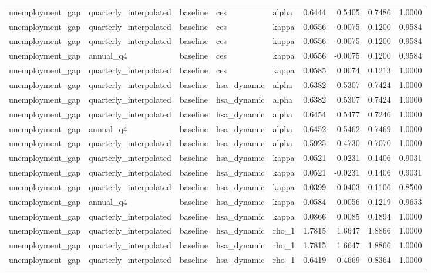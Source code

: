 \begin{tabular}{lllllrrrr}
unemployment\_gap & quarterly\_interpolated & baseline & ces & alpha & 0.6444 & 0.5405 & 0.7486 & 1.0000 \\
unemployment\_gap & quarterly\_interpolated & baseline & ces & kappa & 0.0556 & -0.0075 & 0.1200 & 0.9584 \\
unemployment\_gap & quarterly\_interpolated & baseline & ces & kappa & 0.0556 & -0.0075 & 0.1200 & 0.9584 \\
unemployment\_gap & annual\_q4 & baseline & ces & kappa & 0.0556 & -0.0075 & 0.1200 & 0.9584 \\
unemployment\_gap & quarterly\_interpolated & baseline & ces & kappa & 0.0585 & 0.0074 & 0.1213 & 1.0000 \\
unemployment\_gap & quarterly\_interpolated & baseline & hsa\_dynamic & alpha & 0.6382 & 0.5307 & 0.7424 & 1.0000 \\
unemployment\_gap & quarterly\_interpolated & baseline & hsa\_dynamic & alpha & 0.6382 & 0.5307 & 0.7424 & 1.0000 \\
unemployment\_gap & quarterly\_interpolated & baseline & hsa\_dynamic & alpha & 0.6454 & 0.5477 & 0.7246 & 1.0000 \\
unemployment\_gap & annual\_q4 & baseline & hsa\_dynamic & alpha & 0.6452 & 0.5462 & 0.7469 & 1.0000 \\
unemployment\_gap & quarterly\_interpolated & baseline & hsa\_dynamic & alpha & 0.5925 & 0.4730 & 0.7070 & 1.0000 \\
unemployment\_gap & quarterly\_interpolated & baseline & hsa\_dynamic & kappa & 0.0521 & -0.0231 & 0.1406 & 0.9031 \\
unemployment\_gap & quarterly\_interpolated & baseline & hsa\_dynamic & kappa & 0.0521 & -0.0231 & 0.1406 & 0.9031 \\
unemployment\_gap & quarterly\_interpolated & baseline & hsa\_dynamic & kappa & 0.0399 & -0.0403 & 0.1106 & 0.8500 \\
unemployment\_gap & annual\_q4 & baseline & hsa\_dynamic & kappa & 0.0584 & -0.0056 & 0.1219 & 0.9653 \\
unemployment\_gap & quarterly\_interpolated & baseline & hsa\_dynamic & kappa & 0.0866 & 0.0085 & 0.1894 & 1.0000 \\
unemployment\_gap & quarterly\_interpolated & baseline & hsa\_dynamic & rho\_1 & 1.7815 & 1.6647 & 1.8866 & 1.0000 \\
unemployment\_gap & quarterly\_interpolated & baseline & hsa\_dynamic & rho\_1 & 1.7815 & 1.6647 & 1.8866 & 1.0000 \\
unemployment\_gap & quarterly\_interpolated & baseline & hsa\_dynamic & rho\_1 & 0.6419 & 0.4669 & 0.8364 & 1.0000 \\

\end{tabular}
